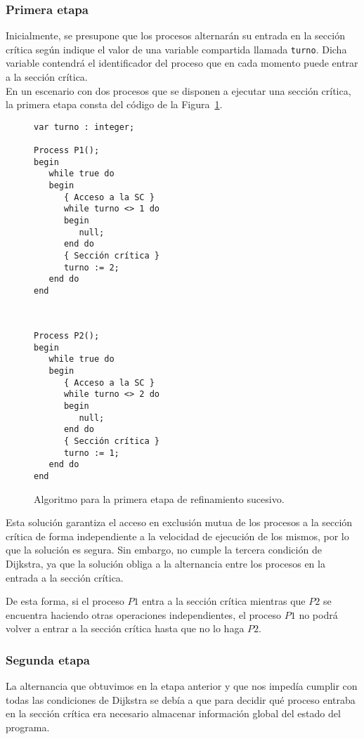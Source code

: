 \subsubsection{Primera etapa}
Inicialmente, se presupone que los procesos alternarán su entrada en la sección crítica según indique el valor de una variable compartida llamada \verb|turno|. Dicha variable contendrá el identificador del proceso que en cada momento puede entrar a la sección crítica.\\

En un escenario con dos procesos que se disponen a ejecutar una sección crítica, la primera etapa consta del código de la Figura~\ref{fig:cod_primera_etapa}.

\begin{figure}
    \centering
    \setlength{\columnsep}{1cm}
    \begin{multicols}{2}
\begin{verbatim}
var turno : integer;

Process P1();
begin
   while true do
   begin
      { Acceso a la SC }
      while turno <> 1 do
      begin
         null;
      end do
      { Sección crítica }
      turno := 2;
   end do
end
\end{verbatim}
\begin{verbatim}


Process P2();
begin
   while true do
   begin
      { Acceso a la SC }
      while turno <> 2 do
      begin
         null;
      end do
      { Sección crítica }
      turno := 1;
   end do
end
\end{verbatim}
\end{multicols}
\caption{Algoritmo para la primera etapa de refinamiento sucesivo.}
\label{fig:cod_primera_etapa}
\end{figure}


Esta solución garantiza el acceso en exclusión mutua de los procesos a la sección crítica de forma independiente a la velocidad de ejecución de los mismos, por lo que la solución es segura. Sin embargo, no cumple la tercera condición de Dijkstra, ya que la solución obliga a la alternancia entre los procesos en la entrada a la sección crítica. 

De esta forma, si el proceso $P1$ entra a la sección crítica mientras que $P2$ se encuentra haciendo otras operaciones independientes, el proceso $P1$ no podrá volver a entrar a la sección crítica hasta que no lo haga $P2$.

\subsubsection{Segunda etapa}
La alternancia que obtuvimos en la etapa anterior y que nos impedía cumplir con todas las condiciones de Dijkstra se debía a que para decidir qué proceso entraba en la sección crítica era necesario almacenar información global del estado del programa.

